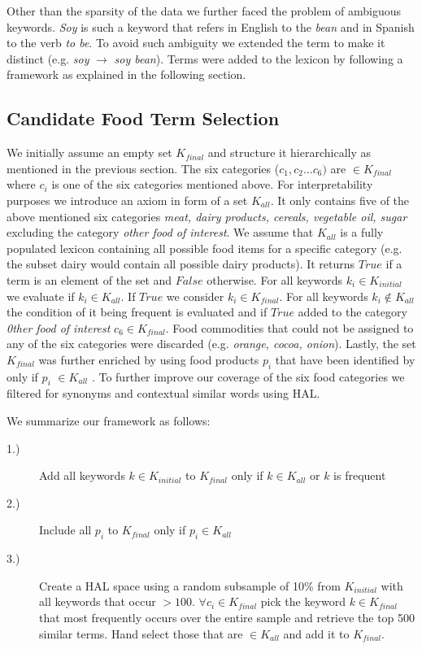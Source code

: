  Other than the sparsity of the data we further faced the problem of ambiguous keywords. \emph {Soy} is such a keyword that refers in English to the \emph{bean} and in Spanish to the verb \emph{to be}. To avoid such ambiguity we extended the term to make it distinct (e.g. \emph{soy} $\to$  \emph{soy bean}). Terms were added to the lexicon by following a framework as explained in the following section. 



\subsection{Candidate Food Term Selection}

We initially assume an empty set $K_{final}$ and structure it hierarchically as mentioned in the previous section. The six categories ($c_1, c_2 ... c_6)$ are $\in K_{final}$ where $c_i$ is one of the six categories mentioned above. For interpretability purposes we introduce an axiom in form of a set $K_{all}$. It only contains five of the above mentioned six categories \emph{meat, dairy products, cereals, vegetable oil, sugar} excluding the category \emph{other food of interest}. We assume that $K_{all}$ is a fully populated lexicon containing all possible food items for a specific category (e.g. the subset dairy would contain all possible dairy products). It returns $True$ if a term is an element of the set and $False$ otherwise. For all keywords $k_i \in K_{initial}$ we evaluate if $k_i\in K_{all}$. If $True$ we consider $k_i \in K_{final}$. For all keywords $k_i \notin K_{all}$ the condition of it being frequent is evaluated and if $True$ added to the category \emph{0ther food of interest}  $c_6 \in K_{final}$.  Food commodities that could not be assigned to any of the six categories were discarded (e.g. \emph {orange, cocoa, onion}). Lastly, the set $K_{final}$  was further enriched by using food products $p_i$ that have been identified by \cite{AbbarMW14}  only if $p_i$ $\in K_{all}$ . To further improve our coverage of the six food categories we filtered for synonyms and contextual similar words using HAL. 

We summarize our framework as follows: 

\begin{description}
  \item[1.)] Add all keywords $k \in K_{initial}$ to  $K_{final}$ only if $k \in K_{all} $ or $k$ is frequent 
  \item[2.)] Include all $p_i$ to $K_{final}$ only if $p_i \in K_{all}$
  \item[3.)] Create a HAL space using a random subsample of 10\% from $K_{initial}$ with all keywords that occur $> 100$. $\forall c_i \in K_{final} $  pick the keyword $k\in K_{final}$ that most frequently occurs over the entire sample and retrieve the top 500 similar terms. Hand select those that are $\in K_{all}$ and add it to $K_{final}$.
\end{description}
 

